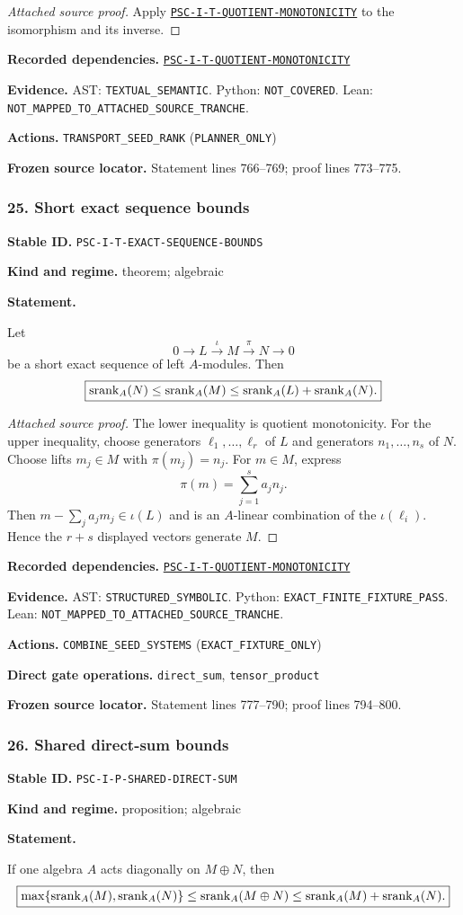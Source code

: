 \documentclass[a4paper,11pt]{article}
\newcommand{\field}[2]{\noindent\textbf{#1.} #2\par}
\begin{document}
\begin{proof}[Attached source proof]
Apply \hyperref[rec:PSC-I-T-QUOTIENT-MONOTONICITY]{\nolinkurl{PSC-I-T-QUOTIENT-MONOTONICITY}} to the isomorphism and its inverse.
\end{proof}
\field{Recorded dependencies}{\hyperref[rec:PSC-I-T-QUOTIENT-MONOTONICITY]{\nolinkurl{PSC-I-T-QUOTIENT-MONOTONICITY}}}
\field{Evidence}{AST: \nolinkurl{TEXTUAL_SEMANTIC}. Python: \nolinkurl{NOT_COVERED}. Lean: \nolinkurl{NOT_MAPPED_TO_ATTACHED_SOURCE_TRANCHE}.}
\field{Actions}{\nolinkurl{TRANSPORT_SEED_RANK} (\nolinkurl{PLANNER_ONLY})}
\field{Frozen source locator}{Statement lines 766--769; proof lines 773--775.}
\subsubsection*{25. Short exact sequence bounds}
\label{rec:PSC-I-T-EXACT-SEQUENCE-BOUNDS}
\field{Stable ID}{\nolinkurl{PSC-I-T-EXACT-SEQUENCE-BOUNDS}}
\field{Kind and regime}{theorem; algebraic}
\textbf{Statement.}\par
Let
\[
0\longrightarrow L\xrightarrow{\iota}M\xrightarrow{\pi}N\longrightarrow0
\]
be a short exact sequence of left $A$-modules.  Then
\[
\boxed{
\operatorname{srank}_A(N)\leq\operatorname{srank}_A(M)
\leq\operatorname{srank}_A(L)+\operatorname{srank}_A(N).
}
\]

\begin{proof}[Attached source proof]
The lower inequality is quotient monotonicity.  For the upper inequality, choose generators $\ell_1,\ldots,\ell_r$ of $L$ and generators $n_1,\ldots,n_s$ of $N$.  Choose lifts $m_j\in M$ with $\pi(m_j)=n_j$.  For $m\in M$, express
\[
\pi(m)=\sum_{j=1}^sa_jn_j.
\]
Then $m-\sum_ja_jm_j\in\iota(L)$ and is an $A$-linear combination of the $\iota(\ell_i)$.  Hence the $r+s$ displayed vectors generate $M$.
\end{proof}
\field{Recorded dependencies}{\hyperref[rec:PSC-I-T-QUOTIENT-MONOTONICITY]{\nolinkurl{PSC-I-T-QUOTIENT-MONOTONICITY}}}
\field{Evidence}{AST: \nolinkurl{STRUCTURED_SYMBOLIC}. Python: \nolinkurl{EXACT_FINITE_FIXTURE_PASS}. Lean: \nolinkurl{NOT_MAPPED_TO_ATTACHED_SOURCE_TRANCHE}.}
\field{Actions}{\nolinkurl{COMBINE_SEED_SYSTEMS} (\nolinkurl{EXACT_FIXTURE_ONLY})}
\field{Direct gate operations}{\nolinkurl{direct_sum}, \nolinkurl{tensor_product}}
\field{Frozen source locator}{Statement lines 777--790; proof lines 794--800.}
\subsubsection*{26. Shared direct-sum bounds}
\label{rec:PSC-I-P-SHARED-DIRECT-SUM}
\field{Stable ID}{\nolinkurl{PSC-I-P-SHARED-DIRECT-SUM}}
\field{Kind and regime}{proposition; algebraic}
\textbf{Statement.}\par
If one algebra $A$ acts diagonally on $M\oplus N$, then
\[
\boxed{
\max\{\operatorname{srank}_A(M),\operatorname{srank}_A(N)\}
\leq\operatorname{srank}_A(M\oplus N)
\leq\operatorname{srank}_A(M)+\operatorname{srank}_A(N).
}
\]
\end{document}
